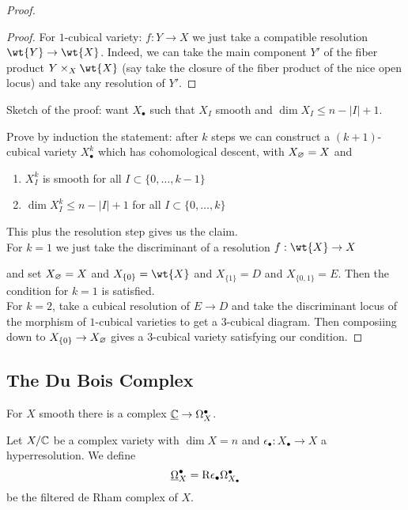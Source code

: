 \documentclass[12pt]{article}
\newcommand{\R}{\mathrm{R}}
\begin{document}
\begin{proof}
\begin{proof}
For $1$-cubical variety: $f : Y \to X$ we just take a compatible resolution $\wt{Y} \to \wt{X}$. Indeed, we can take the main component $Y'$ of the fiber product $Y \times_X \wt{X}$ (say take the closure of the fiber product of the nice open locus) and take any resolution of $Y'$. 
\end{proof}

Sketch of the proof: want $X_\bullet$ such that $X_I$ smooth and $\dim{X_I} \le n - |I| + 1$.

Prove by induction the statement: after $k$ steps we can construct a $(k+1)$-cubical variety $X^k_\bullet$ which has cohomological descent, with $X_{\varnothing} = X$ and
\begin{enumerate}
\item $X^k_I$ is smooth for all $I \subset \{ 0, \dots, k-1 \}$
\item $\dim{X^k_I} \le n - |I| + 1$ for all $I \subset \{ 0, \dots, k \}$
\end{enumerate}
This plus the resolution step gives us the claim. 
\bigskip\\
For $k = 1$ we just take the discriminant of a resolution $f : \wt{X} \to X$ 
\begin{center}
\end{center}
and set $X_{\varnothing} = X$ and $X_{\{0\}} = \wt{X}$ and $X_{\{1\}} = D$ and $X_{\{0,1\}} = E$. Then the condition for $k=1$ is satisfied. 
\bigskip\\
For $k = 2$, take a cubical resolution of $E \to D$ and take the discriminant locus of the morphism of $1$-cubical varieties to get a $3$-cubical diagram. Then composiing down to $X_{\{0\}} \to X_{\varnothing}$ gives a $3$-cubical variety satisfying our condition.
\end{proof}

\subsection{The Du Bois Complex}

For $X$ smooth there is a complex $\underline{\mathbb{C}} \to \Omega_X^\bullet$. 

\begin{defn}
Let $X / \mathbb{C}$ be a complex variety with $\dim{X} = n$ and $\epsilon_\bullet : X_\bullet \to X$ a hyperresolution. We define
\[ \ul{\Omega}_X^\bullet = \R \epsilon_\bullet \Omega^\bullet_{X_\bullet} \]
be the filtered de Rham complex of $X$. 
\end{defn} 
\end{document}
